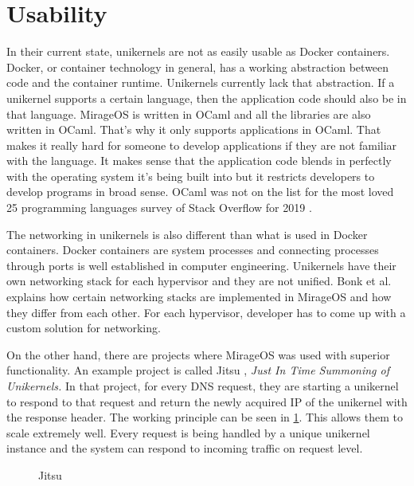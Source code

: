 \section{Usability}
In their current state, unikernels are not as easily usable as Docker containers. Docker, or container technology in general, has a working abstraction between code and the container runtime. Unikernels currently lack that abstraction. If a unikernel supports a certain language, then the application code should also be in that language. MirageOS is written in OCaml and all the libraries are also written in OCaml. That's why it only supports applications in OCaml. That makes it really hard for someone to develop applications if they are not familiar with the language. It makes sense that the application code blends in perfectly with the operating system it's being built into but  it restricts developers to develop programs in broad sense. OCaml was not on the list for the most loved 25 programming languages survey of Stack Overflow for 2019 \cite{2019-survey}.

The networking in unikernels is also different than what is used in Docker containers. Docker containers are system processes and connecting processes through ports is well established in computer engineering. Unikernels have their own networking stack for each hypervisor and they are not unified. Bonk et al. \cite{Bonk} explains how certain networking stacks are implemented in MirageOS and how they differ from each other. For each hypervisor, developer has to come up with a custom solution for networking.

On the other hand, there are projects where MirageOS was used with superior functionality. An example project is called Jitsu \cite{jitsu}, \textit{Just In Time Summoning of Unikernels.} In that project, for every DNS request, they are starting a unikernel to respond to that request and return the newly acquired IP of the unikernel with the response header. The working principle can be seen in \ref{fig:jitsu}. This allows them to scale extremely well. Every request is being handled by a unique unikernel instance and the system can respond to incoming traffic on request level.

\begin{figure}[h!]
\centering
\begin {sequencediagram}


\end {sequencediagram}
\caption{Jitsu \cite{jitsu}}\label{fig:jitsu}
\end{figure}

